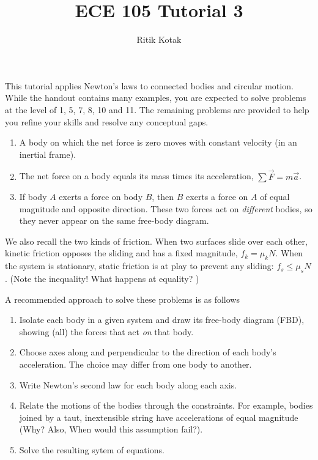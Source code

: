 \documentclass[12pt]{article}
\title{ECE 105 Tutorial 3}
\author{Ritik Kotak}
\date{}
\newcounter{problem}
\begin{document}
\maketitle

This tutorial applies Newton's laws to connected bodies and circular motion. While the handout contains many examples, you are expected to solve problems at the level of 1, 5, 7, 8, 10 and 11. The remaining problems are provided to help you refine your skills and resolve any conceptual gaps.

\begin{textbox}

\begin{enumerate}[label=\arabic*.]
  \item A body on which the net force is zero moves with constant velocity (in an inertial frame).
  \item The net force on a body equals its mass times its acceleration, $\sum \vec F = m\vec a$.
  \item If body $A$ exerts a force on body $B$, then $B$ exerts a force on $A$ of equal magnitude and opposite direction. These two forces act on \emph{different} bodies, so they never appear on the same free-body diagram.
\end{enumerate}
We also recall the  two kinds of friction. When two surfaces slide over each other, kinetic friction opposes the sliding and has a fixed magnitude, $f_k = \mu_k N$. When the system is stationary, static friction is at play to prevent any sliding: $f_s \leq \mu_s N$. (Note the inequality! What happens at equality? )
\end{textbox}

A recommended approach to solve these problems is as follows
\begin{enumerate}[label=(\roman*)]
  \item Isolate each body in a given system and draw its free-body diagram (FBD), showing (all) the forces that act \emph{on} that body.
  \item Choose axes along and perpendicular to the direction of each body's acceleration. The choice may differ from one body to another. 
  \item Write Newton's second law for each body along each axis.
  \item Relate the motions of the bodies through the constraints. For example, bodies joined by a taut, inextensible string have accelerations of equal magnitude (Why? Also, When would this assumption fail?).
  \item Solve the resulting sytem of equations.
\end{enumerate}
\end{document}
